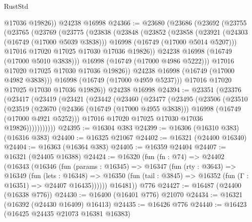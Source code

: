 \begin{lexlean}{RustStd}
\begin{coremodule}
        @17036
        @19826))
    @24238
    @16998
@24366 := @23680
    (@23686
      (@23692
        (@23755
          (@23765
            (@23769
              (@23775
                (@23838
                  (@23848
                    (@23852
                      (@23858
                        (@23921
                          (@24303 (@16749 (@17000 @5039 @3838)))
                          @16998
                          (@16749 (@17000 @5014 @5207)))
                        @17016
                        @17020
                        @17025
                        @17030
                        @17036
                        @19826))
                    @24238
                    @16998
                    (@16749 (@17000 @5010 @3838)))
                  @16998
                  (@16749 (@17000 @4986 @5222)))
                @17016
                @17020
                @17025
                @17030
                @17036
                @19826))
            @24238
            @16998
            (@16749 (@17000 @4982 @3838)))
          @16998
          (@16749 (@17000 @4959 @5237)))
        @17016
        @17020
        @17025
        @17030
        @17036
        @19826))
    @24238
    @16998
@24394 := @23351
    (@23376
      (@23417
        (@23419
          (@23421
            (@23442
              (@23460
                (@23477
                  (@23495
                    (@23506
                      (@23510
                        (@23519
                          (@23670
                            (@24366 (@16749 (@17000 @4955 @3838)))
                            @16998
                            (@16749 (@17000 @4921 @5252)))
                          @17016
                          @17020
                          @17025
                          @17030
                          @17036
                          @19826)))))))))))
@24395 := @16304 @383
@24399 := @16306 (@16310 @383) (@16316 @383)
@24400 := @16325 @21067
@24402 := @16321 (@24400 @16340)
@24404 := @16363 (@16364 @383)
@24405 := @16359 @24404
@24407 := @16321 (@24405 @16388)
@24424 := @16320
    (fun (fn : @74) =>
    @24402
      (@16343
        (@16346
          (fun (params : @16345) =>
          @16347
            (fun (rty : @3643) =>
            @16349
              (fun (lets : @16348) =>
              @16350 (fun (tail : @3845) => @16352 (fun (Γ : @16351) => @24407 @16435))))))
        @16481))
    @776
@24427 := @16487 (@24400 (@16338 @776))
@24430 := @16400 (@16401 @776) @21070
@24434 := @16321 (@16392 (@24430 @16409) @16413)
@24435 := @16426 @776
@24440 := @16423 (@16425 @24435 @21073 @16381 @16383)

\end{coremodule}
\end{lexlean}
